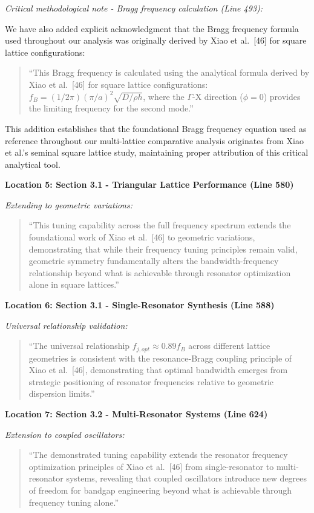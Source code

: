 \documentclass[11pt,a4paper]{article}
\newenvironment{changesbox}{%
    \par\medskip\noindent{\color{changescolor}\rule{\linewidth}{2pt}}\par
    \noindent{\color{changescolor}\bfseries Manuscript Changes}\par\smallskip
}{%
    \par\noindent{\color{changescolor}\rule{\linewidth}{0.5pt}}\medskip
}
\begin{document}
\begin{changesbox}
\textit{Critical methodological note - Bragg frequency calculation (Line 493):}

We have also added explicit acknowledgment that the Bragg frequency formula used throughout our analysis was originally derived by Xiao et al.~[46] for square lattice configurations:
\begin{quote}
\textcolor{redtext}{``This Bragg frequency is calculated using the analytical formula derived by Xiao et al.~[46] for square lattice configurations: $f_B = (1/2\pi)(\pi/a)^2\sqrt{D/\rho h}$, where the $\Gamma$-X direction ($\phi = 0$) provides the limiting frequency for the second mode.''}
\end{quote}

This addition establishes that the foundational Bragg frequency equation used as reference throughout our multi-lattice comparative analysis originates from Xiao et al.'s seminal square lattice study, maintaining proper attribution of this critical analytical tool.

\textbf{Location 5: Section 3.1 - Triangular Lattice Performance (Line 580)}

\textit{Extending to geometric variations:}
\begin{quote}
\textcolor{redtext}{``This tuning capability across the full frequency spectrum extends the foundational work of Xiao et al.~[46] to geometric variations, demonstrating that while their frequency tuning principles remain valid, geometric symmetry fundamentally alters the bandwidth-frequency relationship beyond what is achievable through resonator optimization alone in square lattices.''}
\end{quote}

\textbf{Location 6: Section 3.1 - Single-Resonator Synthesis (Line 588)}

\textit{Universal relationship validation:}
\begin{quote}
\textcolor{redtext}{``The universal relationship $f_{j,opt} \approx 0.89 f_B$ across different lattice geometries is consistent with the resonance-Bragg coupling principle of Xiao et al.~[46], demonstrating that optimal bandwidth emerges from strategic positioning of resonator frequencies relative to geometric dispersion limits.''}
\end{quote}

\textbf{Location 7: Section 3.2 - Multi-Resonator Systems (Line 624)}

\textit{Extension to coupled oscillators:}
\begin{quote}
\textcolor{redtext}{``The demonstrated tuning capability extends the resonator frequency optimization principles of Xiao et al.~[46] from single-resonator to multi-resonator systems, revealing that coupled oscillators introduce new degrees of freedom for bandgap engineering beyond what is achievable through frequency tuning alone.''}
\end{quote}


\end{changesbox}
\end{document}
